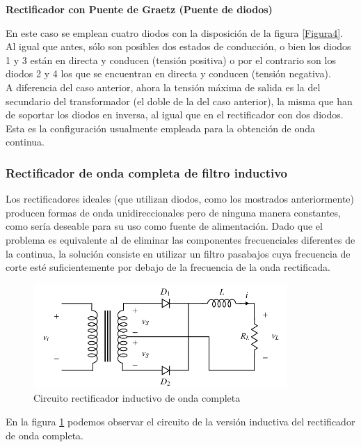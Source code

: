 \documentclass[a4paper,12pt]{article}
\begin{document}
\textbf{Rectificador con Puente de Graetz (Puente de diodos)}

\indent En este caso se emplean cuatro diodos con la disposición de la figura \ref{Figura4}. Al igual que antes, sólo son posibles dos estados de conducción, o bien los diodos 1 y 3 están en directa y conducen (tensión positiva) o por el contrario son los diodos 2 y 4 los que se encuentran en directa y conducen (tensión negativa).\\

\indent A diferencia del caso anterior, ahora la tensión máxima de salida es la del secundario del transformador (el doble de la del caso anterior), la misma que han de soportar los diodos en inversa, al igual que en el rectificador con dos diodos. Esta es la configuración usualmente empleada para la obtención de onda continua.\\

\subsubsection{Rectificador de onda completa de filtro inductivo}

\indent Los rectificadores ideales (que utilizan diodos, como los mostrados anteriormente) producen formas de onda unidireccionales pero de ninguna manera constantes, como sería deseable para su uso como fuente de alimentación. Dado que el problema es equivalente al de eliminar las componentes frecuenciales diferentes de la continua, la solución consiste en utilizar un filtro pasabajos cuya frecuencia de corte esté suficientemente por debajo de la
frecuencia de la onda rectificada.\\

\begin{figure}
  \begin{center}
    \includegraphics{images/Circuito_Inductivo_Onda_Completa.png}
    \caption{Circuito rectificador inductivo de onda completa}
    \label{Figura5}
  \end{center}
\end{figure}

\indent En la figura \ref{Figura5} podemos observar el circuito de la versión inductiva del rectificador de onda
completa.\\
\end{document}
